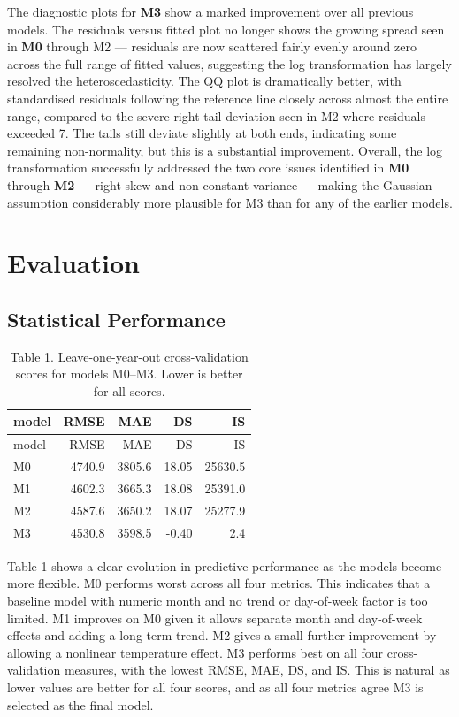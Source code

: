 \documentclass[
]{article}
\begin{document}
The diagnostic plots for \textbf{M3} show a marked improvement over all
previous models. The residuals versus fitted plot no longer shows the
growing spread seen in \textbf{M0} through M2 --- residuals are now
scattered fairly evenly around zero across the full range of fitted
values, suggesting the log transformation has largely resolved the
heteroscedasticity. The QQ plot is dramatically better, with
standardised residuals following the reference line closely across
almost the entire range, compared to the severe right tail deviation
seen in M2 where residuals exceeded 7. The tails still deviate slightly
at both ends, indicating some remaining non-normality, but this is a
substantial improvement. Overall, the log transformation successfully
addressed the two core issues identified in \textbf{M0} through
\textbf{M2} --- right skew and non-constant variance --- making the
Gaussian assumption considerably more plausible for M3 than for any of
the earlier models.

\section{Evaluation}\label{evaluation}

\subsection{Statistical Performance}\label{statistical-performance}

\begin{longtable}[]{@{}lrrrr@{}}
\caption{Table 1. Leave-one-year-out cross-validation scores for models
M0--M3. Lower is better for all scores.}\tabularnewline
\toprule\noalign{}
model & RMSE & MAE & DS & IS \\
\midrule\noalign{}
\endfirsthead
\toprule\noalign{}
model & RMSE & MAE & DS & IS \\
\midrule\noalign{}
\endhead
\bottomrule\noalign{}
\endlastfoot
M0 & 4740.9 & 3805.6 & 18.05 & 25630.5 \\
M1 & 4602.3 & 3665.3 & 18.08 & 25391.0 \\
M2 & 4587.6 & 3650.2 & 18.07 & 25277.9 \\
M3 & 4530.8 & 3598.5 & -0.40 & 2.4 \\
\end{longtable}

Table 1 shows a clear evolution in predictive performance as the models
become more flexible. M0 performs worst across all four metrics. This
indicates that a baseline model with numeric month and no trend or
day-of-week factor is too limited. M1 improves on M0 given it allows
separate month and day-of-week effects and adding a long-term trend. M2
gives a small further improvement by allowing a nonlinear temperature
effect. M3 performs best on all four cross-validation measures, with the
lowest RMSE, MAE, DS, and IS. This is natural as lower values are better
for all four scores, and as all four metrics agree M3 is selected as the
final model.
\end{document}
